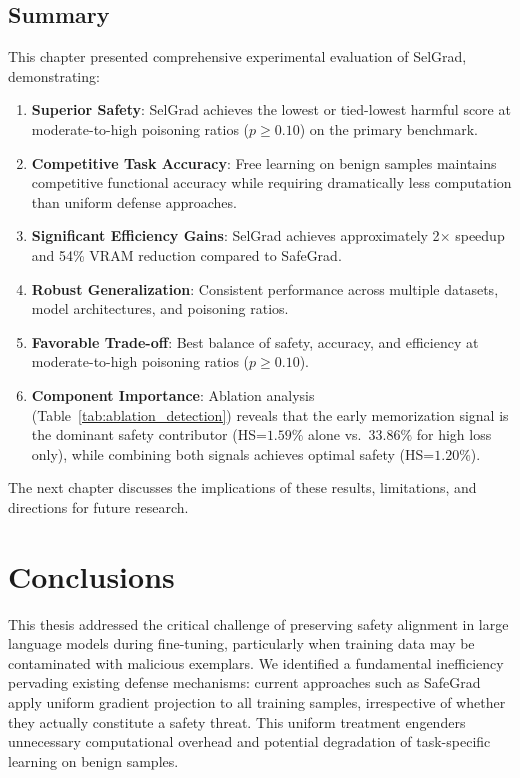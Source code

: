 \section{Summary}
\label{sec:results_summary}

This chapter presented comprehensive experimental evaluation of SelGrad, demonstrating:

\begin{enumerate}
    \item \textbf{Superior Safety}: SelGrad achieves the lowest or tied-lowest harmful score at moderate-to-high poisoning ratios ($p \geq 0.10$) on the primary benchmark.

    \item \textbf{Competitive Task Accuracy}: Free learning on benign samples maintains competitive functional accuracy while requiring dramatically less computation than uniform defense approaches.

    \item \textbf{Significant Efficiency Gains}: SelGrad achieves approximately 2$\times$ speedup and 54\% VRAM reduction compared to SafeGrad.

    \item \textbf{Robust Generalization}: Consistent performance across multiple datasets, model architectures, and poisoning ratios.

    \item \textbf{Favorable Trade-off}: Best balance of safety, accuracy, and efficiency at moderate-to-high poisoning ratios ($p \geq 0.10$).

    \item \textbf{Component Importance}: Ablation analysis (Table~\ref{tab:ablation_detection}) reveals that the early memorization signal is the dominant safety contributor (HS=$1.59\%$ alone vs.\ $33.86\%$ for high loss only), while combining both signals achieves optimal safety (HS=$1.20\%$).
\end{enumerate}

The next chapter discusses the implications of these results, limitations, and directions for future research.

\chapter{Conclusions}
\label{cha:conclusions}

This thesis addressed the critical challenge of preserving safety alignment in large language models during fine-tuning, particularly when training data may be contaminated with malicious exemplars. We identified a fundamental inefficiency pervading existing defense mechanisms: current approaches such as SafeGrad apply uniform gradient projection to all training samples, irrespective of whether they actually constitute a safety threat. This uniform treatment engenders unnecessary computational overhead and potential degradation of task-specific learning on benign samples.

